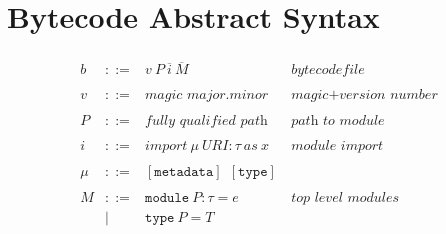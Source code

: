 \documentclass{article}
\newcommand{\keywadj}[1]{\mathtt{#1}}
\newcommand{\keyw}[1]{\keywadj{#1}~}
\begin{document}
\section{Bytecode Abstract Syntax}


\[
\begin{array}{lll}
\begin{array}{lllr}
b   & ::= & v ~P ~\overline{i} ~\overline{M}        & bytecode file \\
&&\\
v   & ::= & \textit{magic major.minor}              & \textit{magic+version number} \\
&&\\

P   & ::= & \textit{fully qualified path}           & \textit{path to module} \\
&&\\

i   & ::= & import ~\mu ~\textit{URI} : \tau ~as ~x & \textit{module import} \\
&&\\

\mu & ::= & \keyw{[metadata]} ~\keyw{[type]}        & \\
&&\\


M & ::= & \keyw{module} P: \tau = e & \textit{top level modules} \\
  & |   & \keyw{type} P = T         & \\
&&\\


\end{array}
\end{array}\]
\end{document}

